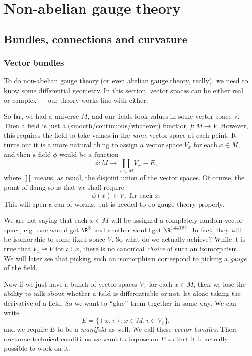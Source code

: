 \documentclass[a4paper]{article}
\begin{document}
\section{Non-abelian gauge theory}
\subsection{Bundles, connections and curvature}
\subsubsection*{Vector bundles}
To do non-abelian gauge theory (or even abelian gauge theory, really), we need to know some differential geometry. In this section, vector spaces can be either real or complex --- our theory works fine with either.

So far, we had a universe $M$, and our fields took values in some vector space $V$. Then a field is just a (smooth/continuous/whatever) function $f: M \to V$. However, this requires the field to take values in the \emph{same} vector space at each point. It turns out it is a more natural thing to assign a vector space $V_x$ for each $x \in M$, and then a field $\phi$ would be a function
\[
  \phi: M \to \coprod_{x \in M} V_x \equiv E,
\]
where $\coprod$ means, as usual, the disjoint union of the vector spaces. Of course, the point of doing so is that we shall require
\[
  \phi(x) \in V_x \text{ for each $x$}.\tag{$*$}
\]
This will open a can of worms, but is needed to do gauge theory properly.

We are not saying that each $x \in M$ will be assigned a completely random vector space, e.g.\ one would get $\R^3$ and another would get $\R^{144169}$. In fact, they will be isomorphic to some fixed space $V$. So what do we actually achieve? While it is true that $V_x \cong V$ for all $x$, there is no canonical \emph{choice} of such an isomorphism. We will later see that picking such an isomorphism correspond to picking a \emph{gauge} of the field.

Now if we just have a bunch of vector spaces $V_x$ for each $x \in M$, then we lose the ability to talk about whether a field is differentiable or not, let alone taking the derivative of a field. So we want to ``glue'' them together in some way. We can write
\[
  E = \{(x, v): x \in M, v \in V_x\},
\]
and we require $E$ to be a \emph{manifold} as well. We call these \emph{vector bundles}. There are some technical conditions we want to impose on $E$ so that it is actually possible to work on it.
\end{document}
